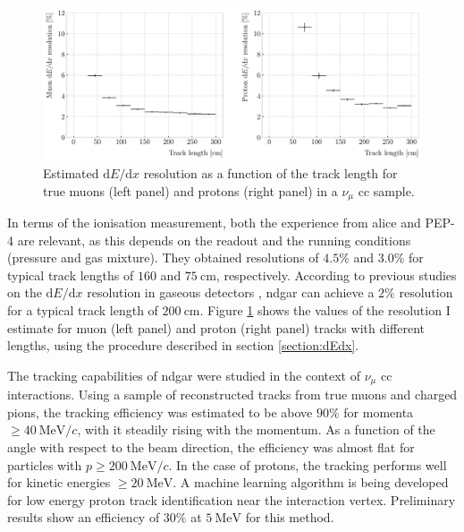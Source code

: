 \begin{figure}[t]
    \centering
    \includegraphics[width=.90\linewidth]{Images/GAr_selection/length_dEdx_resolution_vs_length.pdf}
    \caption[Estimated $\mathrm{d}E/\mathrm{d}x$ resolution as a function of the track length for true muons and protons in a $\nu_{\mu}$ \gls{cc} sample.]{Estimated $\mathrm{d}E/\mathrm{d}x$ resolution as a function of the track length for true muons (left panel) and protons (right panel) in a $\nu_{\mu}$ \gls{cc} sample.}
    \label{fig:dEdx_resolution_vs_length}
\end{figure}

In terms of the ionisation measurement, both the experience from \gls{alice} and PEP-4 are relevant, as this depends on the readout and the running conditions (pressure and gas mixture). They obtained resolutions of $4.5\%$ and $3.0\%$ for typical track lengths of $160$ and $75~\mathrm{cm}$, respectively. According to previous studies on the $\mathrm{d}E/\mathrm{d}x$ resolution in gaseous detectors \cite{Lehraus1983}, \gls{ndgar} can achieve a $2\%$ resolution for a typical track length of $200~\mathrm{cm}$. Figure \ref{fig:dEdx_resolution_vs_length} shows the values of the resolution I estimate for muon (left panel) and proton (right panel) tracks with different lengths, using the procedure described in section \ref{section:dEdx}.

The tracking capabilities of \gls{ndgar} were studied in the context of $\nu_{\mu}$ \gls{cc} interactions. Using a sample of reconstructed tracks from true muons and charged pions, the tracking efficiency was estimated to be above $90\%$ for momenta $\geq 40 ~ \mathrm{MeV}/c$, with it steadily rising with the momentum. As a function of the angle with respect to the beam direction, the efficiency was almost flat for particles with $p\geq 200 ~ \mathrm{MeV}/c$. In the case of protons, the tracking performs well for kinetic energies $\geq 20 ~ \mathrm{MeV}$. A machine learning algorithm is being developed for low energy proton track identification near the interaction vertex. Preliminary results show an efficiency of $30\%$ at $5 ~ \mathrm{MeV}$ for this method.

